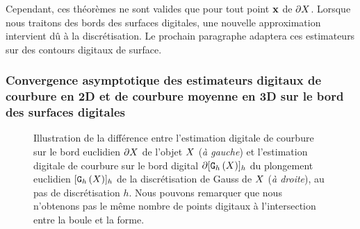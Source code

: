 Cependant, ces théorèmes ne sont valides que pour tout point $\mathbf{x}$ de $\partial X$.
Lorsque nous traitons des bords des surfaces digitales, une nouvelle
approximation intervient dû à la discrétisation. Le prochain paragraphe adaptera
ces estimateurs sur des contours digitaux de surface.
%
\subsubsection{Convergence asymptotique des estimateurs digitaux de courbure en
2D et de courbure moyenne en 3D sur le bord des surfaces digitales}

\begin{figure}[ht]
  \begin{center}
    
  \end{center}
  \caption
  {Illustration de la différence entre l'estimation digitale de courbure sur le
  bord euclidien $\partial X$ de l'objet $X$ (\emph{à gauche}) et l'estimation
  digitale de courbure sur le bord digital $\partial \lbrack \mathtt{G}_{h}\left(X\right) \rbrack_{h}$ du
  plongement euclidien $\lbrack \mathtt{G}_{h}\left(X\right) \rbrack_{h}$ de la discrétisation de Gauss de
  $X$ (\emph{à droite}), au pas de discrétisation $h$. Nous pouvons
  remarquer que nous n'obtenons pas le même nombre de points digitaux à
  l'intersection entre la boule et la
  forme.\label{fig:2d-curv-estimator-xhat}}
\end{figure}

